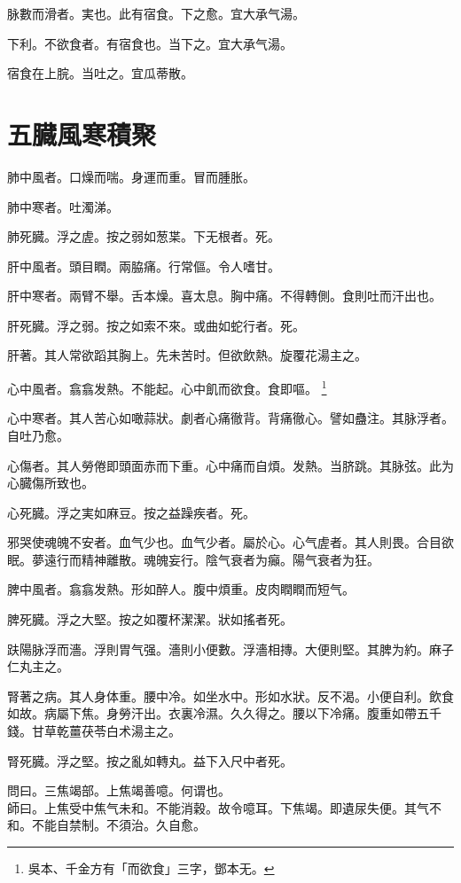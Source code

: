 脉數而滑者。実也。此有宿食。下之愈。宜大承气湯。

下利。不欲食者。有宿食也。当下之。宜大承气湯。

宿食在上脘。当吐之。宜瓜蒂散。

\chapter{五臓風寒積聚}

肺中風者。口燥而喘。身運而重。冒而腫胀。

肺中寒者。吐濁涕。

肺死臓。浮之虗。按之弱如葱枼。下无根者。死。

肝中風者。頭目瞤。兩脇痛。行常傴。令人嗜甘。

肝中寒者。兩臂不舉。舌本燥。喜太息。胸中痛。不得轉側。食則吐而汗出也。

肝死臓。浮之弱。按之如索不來。或曲如蛇行者。死。

肝著。其人常欲蹈其胸上。先未苦时。但欲飲熱。旋覆花湯主之。

心中風者。翕翕发熱。不能起。心中飢{\khaaitp 而欲食}。食即嘔。
	\footnote{吳本、千金方有「而欲食」三字，鄧本无。}

心中寒者。其人苦心如噉蒜狀。劇者心痛徹背。背痛徹心。譬如蠱注。其脉浮者。自吐乃愈。

心傷者。其人勞倦即頭面赤而下重。心中痛而自煩。发熱。当脐跳。其脉弦。此为心臓傷所致也。

心死臓。浮之実如麻豆。按之益躁疾者。死。

邪哭使魂魄不安者。血气少也。血气少者。屬於心。心气虗者。其人則畏。合目欲眠。夢遠行而精神離散。魂魄妄行。陰气衰者为癲。陽气衰者为狂。

脾中風者。翕翕发熱。形如醉人。腹中煩重。皮肉瞤瞤而短气。

脾死臓。浮之大堅。按之如覆杯潔潔。狀如搖者死。

趺陽脉浮而濇。浮則胃气强。濇則小便數。浮濇相摶。大便則堅。其脾为約。麻子仁丸主之。

腎著之病。其人身体重。腰中冷。如坐水中。形如水狀。反不渴。小便自利。飲食如故。病屬下焦。身勞汗出。衣裏冷濕。久久得之。腰以下冷痛。腹重如帶五千錢。甘{\khaaitp 草乾}薑{\khaaitp 茯}苓{\khaaitp 白}术湯主之。

腎死臓。浮之堅。按之亂如轉丸。益下入尺中者死。

問曰。三焦竭部。上焦竭善噫。何谓也。\\
師曰。上焦受中焦气未和。不能消穀。故令噫耳。下焦竭。即遺尿失便。其气不和。不能自禁制。不須治。久自愈。

